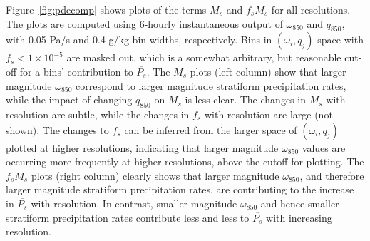 \documentclass[alpha-refs]{wiley-article}
\begin{document}
Figure~\ref{fig:pdecomp} shows plots of the terms $M_s$ and $f_s M_s$ for all resolutions. The plots are computed using 6-hourly instantaneous output of $\omega_{850}$ and $q_{850}$, with 0.05 Pa/s and 0.4 g/kg bin widths, respectively. Bins in  $\left( \omega_{i} , q_{j} \right)$ space with $f_s <1 \times 10^{-5}$ are masked out, which is a somewhat arbitrary, but reasonable cut-off for a bins' contribution to $\overline{P_s}$. The $M_s$ plots (left column) show that larger magnitude $\omega_{850}$ correspond to larger magnitude stratiform precipitation rates, while the impact of changing $q_{850}$ on $M_s$ is less clear. The changes in $M_s$ with resolution are subtle, while the changes in $f_s$ with resolution are large (not shown). The changes to $f_s$ can be inferred from the larger space of $\left( \omega_i , q_j \right)$ plotted at higher resolutions, indicating that larger magnitude $\omega_{850}$ values are occurring more frequently at higher resolutions, above the cutoff for plotting. The $f_s M_s$ plots (right column) clearly shows that larger magnitude $\omega_{850}$, and therefore larger magnitude stratiform precipitation rates, are contributing to the increase in $\overline{P_s}$ with resolution. In contrast, smaller magnitude $\omega_{850}$ and hence smaller stratiform precipitation rates contribute less and less to $\overline{P_s}$ with increasing resolution.
\end{document}
